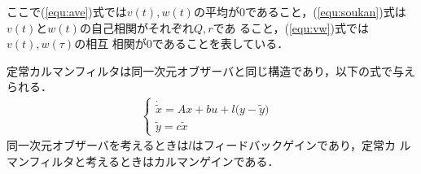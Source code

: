 \documentclass[a4paper,12pt]{jarticle}
\begin{document}
%
ここで(\ref{equ:ave})式では$v(t),w(t)$の平均が0であること，(\ref{equ:soukan})式は
$v(t)$と$w(t)$の自己相関がそれぞれ$Q,r$であ
ること，(\ref{equ:vw})式では$v(t),w(\tau)$の相互
相関が0であることを表している．

定常カルマンフィルタは同一次元オブザーバと同じ構造であり，以下の式で与え
られる．
%
\begin{eqnarray}
 \begin{cases}
\dot{\tilde{x}} = Ax + bu + l \big(y - \tilde{y} \big)
  & \\
  \tilde{y} = c\tilde{x}
 \end{cases}
\end{eqnarray}
%
同一次元オブザーバを考えるときは$l$はフィードバックゲインであり，定常カ
ルマンフィルタと考えるときはカルマンゲインである．

\end{document}
